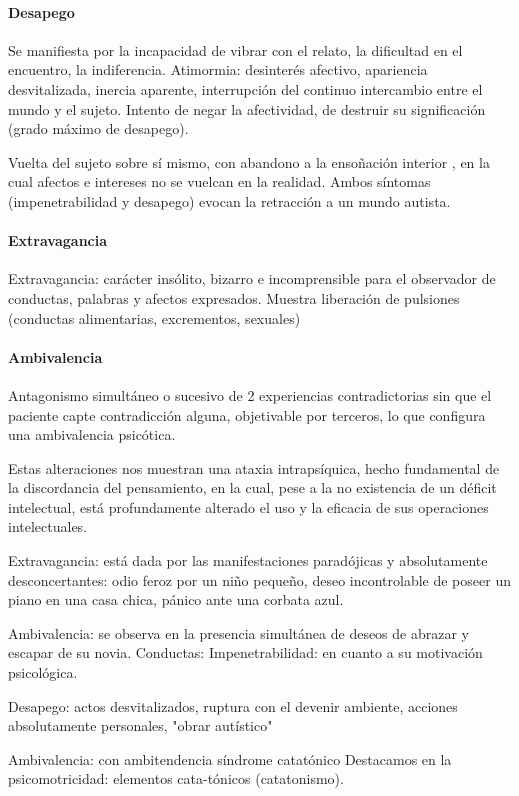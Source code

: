 \paragraph*{Desapego}
Se manifiesta por la incapacidad de vibrar con el relato, la dificultad en el encuentro, la indiferencia. Atimormia: desinterés afectivo, apariencia desvitalizada, inercia aparente, interrupción del continuo intercambio entre el mundo y el sujeto. Intento de negar la afectividad, de destruir su significación (grado máximo de desapego).

Vuelta del sujeto sobre sí mismo, con abandono a la ensoñación interior , en la cual afectos e intereses no se vuelcan en la realidad. Ambos síntomas (impenetrabilidad y desapego) evocan la retracción a un mundo autista.
\paragraph*{Extravagancia}
Extravagancia: carácter insólito, bizarro e incomprensible para el observador de conductas, palabras y afectos expresados. Muestra liberación de pulsiones (conductas alimentarias, excrementos, sexuales)
\paragraph*{Ambivalencia}
Antagonismo simultáneo o sucesivo de 2 experiencias contradictorias sin que el paciente capte contradicción alguna, objetivable por terceros, lo que configura una ambivalencia psicótica.

Estas alteraciones nos muestran una ataxia intrapsíquica, hecho fundamental de la discordancia del pensamiento, en la cual, pese a la no existencia de un déficit intelectual, está profundamente alterado el uso y la eficacia de sus operaciones intelectuales.

Extravagancia: está dada por las manifestaciones paradójicas y absolutamente desconcertantes: odio feroz por un niño pequeño, deseo incontrolable de poseer un piano en una casa chica, pánico ante una corbata azul.

Ambivalencia: se observa en la presencia simultánea de deseos de abrazar y escapar de su novia. Conductas: Impenetrabilidad: en cuanto a su motivación psicológica.

Desapego: actos desvitalizados, ruptura con el devenir ambiente, acciones absolutamente personales, "obrar autístico"

Ambivalencia: con ambitendencia síndrome catatónico Destacamos en la psicomotricidad: elementos cata-tónicos (catatonismo).
